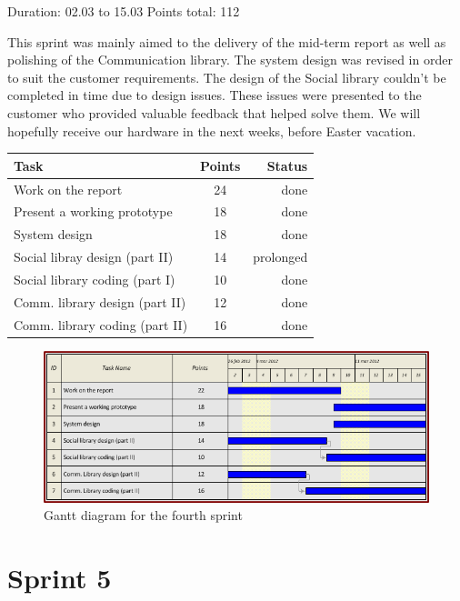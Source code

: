 Duration: 02.03 to 15.03
Points total: 112

This sprint was mainly aimed to the delivery of the mid-term report as well
as polishing of the Communication library. The system design was revised in
order to suit the customer requirements. The design of the Social library couldn't
be completed in time due to design issues. These issues were presented to the
customer who provided valuable feedback that helped solve them.
We will hopefully receive our hardware in the next weeks, before Easter vacation.

\begin{table}[ht!]
\begin{tabular}{ | l | c | r | }

\hline
\textbf{Task} & \textbf{Points} & \textbf{Status} \\
\hline

Work on the report			& 24 & done \\
\hline
Present a working prototype		& 18 & done \\
\hline
System design				& 18 & done \\
\hline
Social libray design (part II)		& 14 & prolonged \\
\hline
Social library coding (part I)		& 10 & done \\
\hline
Comm. library design (part II)		& 12 & done \\
\hline
Comm. library coding (part II)		& 16 & done \\
\hline

\end{tabular}
\end{table}

\begin{figure}[h!]
\centering \includegraphics[scale=0.8]{img/sprints-gantt4.png}
\caption{Gantt diagram for the fourth sprint}
\label{fig:sprints-gantt4}
\end{figure}

\newpage

\section{Sprint 5}

